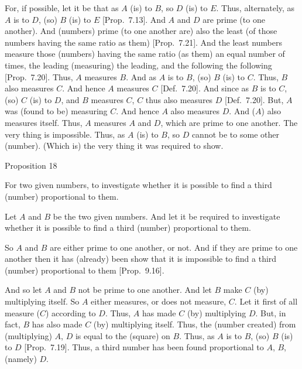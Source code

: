 For, if possible, let it be that as $A$ (is) to $B$, so $D$ (is) to $E$. 
Thus, alternately, as $A$ is to $D$, (so) $B$ (is) to $E$ [Prop.~7.13]. And $A$ and $D$ are prime (to one another).  And (numbers) prime (to one another are)
also the least (of those numbers having the same ratio as them) [Prop.~7.21]. And the least numbers measure those
(numbers) having the same ratio (as them) an equal number of times,
the leading (measuring) the leading, and the following the following [Prop.~7.20]. Thus, $A$ measures $B$. And as $A$
is to $B$, (so) $B$ (is) to $C$.  Thus, $B$ also measures $C$.  And hence
$A$ measures $C$ [Def.~7.20]. And since as $B$ is to
$C$, (so) $C$ (is) to $D$, and $B$ measures $C$, $C$ thus also measures
$D$ [Def.~7.20].  But, $A$ was (found to be) measuring $C$. And 
hence $A$ also measures $D$. And ($A$) also measures itself.  Thus, $A$
measures $A$ and $D$, which are prime to one another. The very thing is impossible. Thus, as $A$ (is) to $B$, so $D$ cannot be to some other (number). (Which is) the very thing it was required to show.


\begin{center}
{\large Proposition 18}
\end{center}

For  two given numbers, to investigate whether it
is possible to find a third (number) proportional to them.

\epsfysize=0.4in
\centerline{}

Let $A$ and $B$ be the two given numbers. And let it be required to investigate whether it is possible to find a third (number) proportional
to them.

So $A$ and $B$ are either prime to one another, or not. 
And if they are prime to one another then it has (already) been show that it is impossible
to find a third (number) proportional to them [Prop.~9.16].

And so let $A$ and $B$ not be prime to one another. And let $B$ make $C$
(by) multiplying itself. So $A$ either measures, or does not measure, $C$. 
Let it first of all measure ($C$) according to $D$. Thus, $A$ has made
$C$ (by) multiplying $D$. But, in fact, $B$ has also made
$C$ (by) multiplying itself. Thus, the (number created) from (multiplying)
$A$, $D$ is equal to the (square) on $B$. Thus, as $A$ is to $B$, (so)
$B$ (is) to $D$ [Prop.~7.19]. Thus, a third number
has been found proportional to $A$, $B$, (namely) $D$. 

